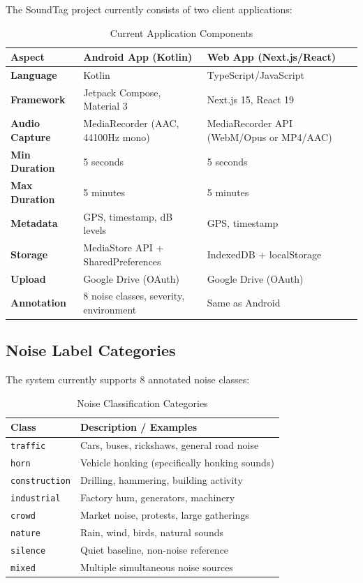 \documentclass[11pt,a4paper]{article}
\begin{document}
The SoundTag project currently consists of two client applications:

\begin{table}[h]
\centering
\caption{Current Application Components}
\begin{tabular}{@{}p{3cm}p{5cm}p{5cm}@{}}
\toprule
\textbf{Aspect} & \textbf{Android App (Kotlin)} & \textbf{Web App (Next.js/React)} \\
\midrule
\textbf{Language} & Kotlin & TypeScript/JavaScript \\
\textbf{Framework} & Jetpack Compose, Material 3 & Next.js 15, React 19 \\
\textbf{Audio Capture} & MediaRecorder (AAC, 44100Hz mono) & MediaRecorder API (WebM/Opus or MP4/AAC) \\
\textbf{Min Duration} & 5 seconds & 5 seconds \\
\textbf{Max Duration} & 5 minutes & 5 minutes \\
\textbf{Metadata} & GPS, timestamp, dB levels & GPS, timestamp \\
\textbf{Storage} & MediaStore API + SharedPreferences & IndexedDB + localStorage \\
\textbf{Upload} & Google Drive (OAuth) & Google Drive (OAuth) \\
\textbf{Annotation} & 8 noise classes, severity, environment & Same as Android \\
\bottomrule
\end{tabular}
\end{table}

\subsection{Noise Label Categories}

The system currently supports 8 annotated noise classes:

\begin{table}[h]
\centering
\caption{Noise Classification Categories}
\begin{tabular}{@{}p{3cm}p{10cm}@{}}
\toprule
\textbf{Class} & \textbf{Description / Examples} \\
\midrule
\texttt{traffic} & Cars, buses, rickshaws, general road noise \\
\texttt{horn} & Vehicle honking (specifically honking sounds) \\
\texttt{construction} & Drilling, hammering, building activity \\
\texttt{industrial} & Factory hum, generators, machinery \\
\texttt{crowd} & Market noise, protests, large gatherings \\
\texttt{nature} & Rain, wind, birds, natural sounds \\
\texttt{silence} & Quiet baseline, non-noise reference \\
\texttt{mixed} & Multiple simultaneous noise sources \\
\bottomrule
\end{tabular}
\end{table}
\end{document}
